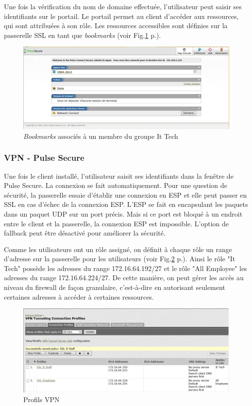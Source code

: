 Une fois la vérification du nom de domaine effectuée, l'utilisateur peut saisir ses identifiants sur le portail.
Le portail permet au client d'accéder aux ressources, qui sont attribuées à son rôle.
Les ressources accessibles sont définies sur la passerelle SSL en tant que \textit{bookmarks} (voir Fig.\ref{fig:bookmarks} p.\pageref{fig:bookmarks}).
\begin{figure}[ht]
	\centering
	\includegraphics[width=16cm]{juniper/portail.png}
	\caption{\textit{Bookmarks} associés à un membre du groupe It Tech}
	\label{fig:bookmarks}
\end{figure}

\subsubsection{VPN - Pulse Secure}
Une fois le client installé, l'utilisateur saisit ses identifiants dans la fenêtre de Pulse Secure. 
La connexion se fait automatiquement. 
Pour une question de sécurité, la passerelle essaie d'établir une connexion en ESP et elle peut passer en SSL en cas d'échec de la connexion ESP.
L'ESP se fait en encapsulant les paquets dans un paquet UDP sur un port précis.
Mais si ce port est bloqué à un endroit entre le client et la passerelle, la connexion ESP est impossible.
L'option de fallback peut être désactivé pour améliorer la sécurité. 

Comme les utilisateurs ont un rôle assigné, on définit à chaque rôle un range d'adresse sur la passerelle pour les utilisateurs (voir Fig.\ref{fig:profilVPN} p.\pageref{fig:profilVPN}).
Ainsi le rôle "It Tech" possède les adresses du range 172.16.64.192/27 et le rôle "All Employee" les adresses du range 172.16.64.224/27.
De cette manière, on peut gérer les accès au niveau du firewall de façon granulaire, c'est-à-dire en autorisant seulement certaines adresses à accéder à certaines ressources.
\begin{figure}[ht]
	\centering
	\includegraphics[width=16cm]{juniper/VPNProfiles.png}
	\caption{Profils VPN}
	\label{fig:profilVPN}
\end{figure}